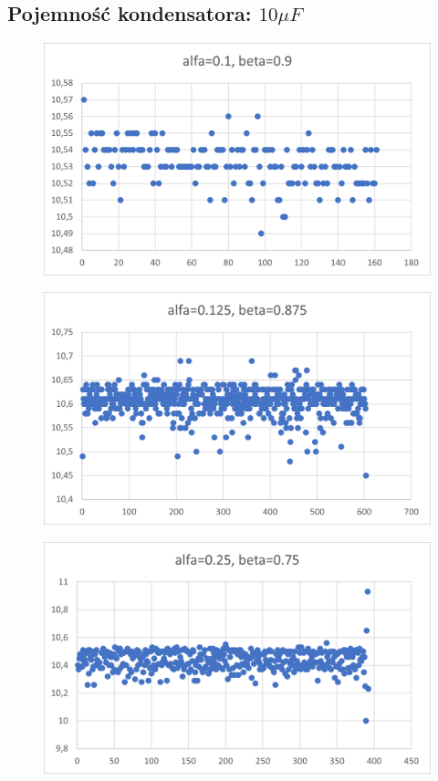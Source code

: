 \documentclass[12pt]{mwart}
\begin{document}
	\subsection{Pojemność kondensatora: $10 \mu F$}
	\begin{figure}[H]
		\centering
		\includegraphics{10_a0.1.png}
	\end{figure}
	\begin{figure}[H]
		\centering
		\includegraphics{10_a0.125.png}
	\end{figure}
	\begin{figure}[H]
		\centering
		\includegraphics{10_a0.25.png}
	\end{figure}
\end{document}
